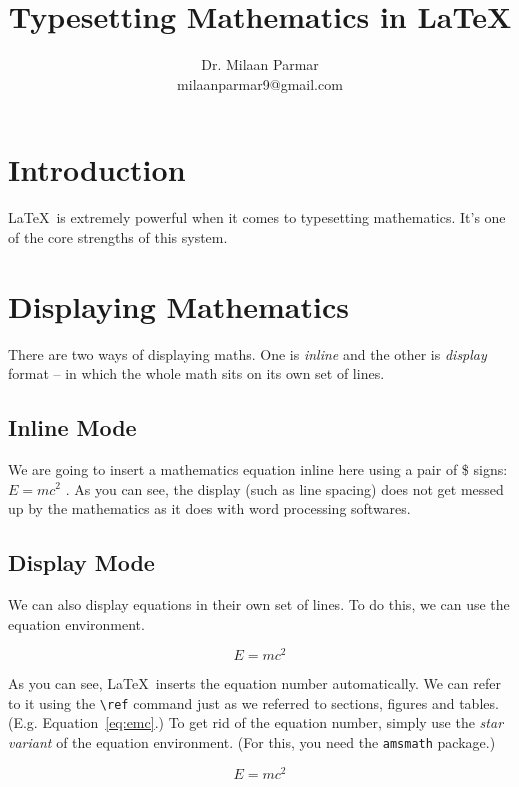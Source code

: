 \documentclass{article}
\begin{document}
\title{Typesetting Mathematics in \LaTeX}
\author{Dr. Milaan Parmar \\ milaanparmar9@gmail.com}
\maketitle


\section{Introduction} 
\LaTeX\ is extremely powerful when it comes to typesetting mathematics. It's one of the core strengths of this system. 

\section{Displaying Mathematics}
There are two ways of displaying maths. One is \emph{inline} and the other is \emph{display} format -- in which the whole math sits on its own set of lines.


\subsection{Inline Mode}
We are going to insert a mathematics equation inline here using a pair of \$ signs:  $E=mc^2$    . As you can see, the display (such as line spacing) does not get messed up by the mathematics as it does with word processing softwares. 

\subsection{Display Mode}
We can also display equations in their own set of lines. To do this, we can use the equation environment. 

\begin{equation}\label{eq:emc}
E=mc^2
\end{equation}

As you can see, \LaTeX\ inserts the equation number automatically. We can refer to it using the \verb|\ref| command just as we referred to sections, figures and tables. (E.g. Equation~\ref{eq:emc}.) To get rid of the equation number, simply use the \emph{star variant} of the equation environment. (For this, you need the \texttt{amsmath} package.)

\begin{equation*}
E=mc^2
\end{equation*}
\end{document}
